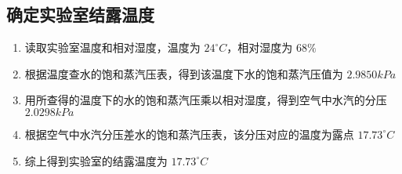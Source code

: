 \documentclass[UTF8]{ctexart}
\begin{document}
\subsection{确定实验室结露温度}
\begin{enumerate}
    \item 读取实验室温度和相对湿度，温度为 $24 ^{\circ}C$，相对湿度为 $68\%$ 
    \item 根据温度查水的饱和蒸汽压表，得到该温度下水的饱和蒸汽压值为 $2.9850kPa$
    \item 用所查得的温度下的水的饱和蒸汽压乘以相对湿度，得到空气中水汽的分压 $2.0298kPa$
    \item 根据空气中水汽分压差水的饱和蒸汽压表，该分压对应的温度为露点 $17.73 ^{\circ}C$
    \item 综上得到实验室的结露温度为 $17.73^{\circ}C$
\end{enumerate}
\end{document}
